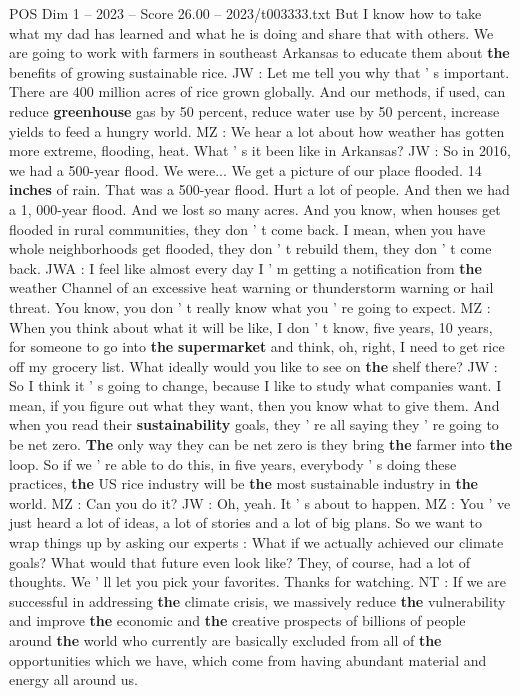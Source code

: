 \begin{textsample}{POS Dim 1 – 2023 – Score 26.00 – 2023/t003333.txt}
But I know how to take what my dad has learned and what he is doing and share that with others.
We are going to work with farmers in southeast Arkansas to educate them about \textbf{the} benefits of growing sustainable rice.
JW : Let me tell you why that ' s important.
There are 400 million acres of rice grown globally.
And our methods, if used, can reduce \textbf{greenhouse} gas by 50 percent, reduce water use by 50 percent, increase yields to feed a hungry world.
MZ : We hear a lot about how weather has gotten more extreme, flooding, heat.
What ' s it been like in Arkansas?
JW : So in 2016, we had a 500-year flood.
We were...
We get a picture of our place flooded. 14 \textbf{inches} of rain.
That was a 500-year flood.
Hurt a lot of people.
And then we had a 1, 000-year flood.
And we lost so many acres.
And you know, when houses get flooded in rural communities, they don ' t come back.
I mean, when you have whole neighborhoods get flooded, they don ' t rebuild them, they don ' t come back.
JWA : I feel like almost every day I ' m getting a notification from \textbf{the} weather Channel of an excessive heat warning or thunderstorm warning or hail threat.
You know, you don ' t really know what you ' re going to expect.
MZ : When you think about what it will be like, I don ' t know, five years, 10 years, for someone to go into \textbf{the} \textbf{supermarket} and think, oh, right, I need to get rice off my grocery list.
What ideally would you like to see on \textbf{the} shelf there?
JW : So I think it ' s going to change, because I like to study what companies want.
I mean, if you figure out what they want, then you know what to give them.
And when you read their \textbf{sustainability} goals, they ' re all saying they ' re going to be net zero. \textbf{The} only way they can be net zero is they bring \textbf{the} farmer into \textbf{the} loop.
So if we ' re able to do this, in five years, everybody ' s doing these practices, \textbf{the} US rice industry will be \textbf{the} most sustainable industry in \textbf{the} world.
MZ : Can you do it?
JW : Oh, yeah.
It ' s about to happen.
MZ : You ' ve just heard a lot of ideas, a lot of stories and a lot of big plans.
So we want to wrap things up by asking our experts : What if we actually achieved our climate goals?
What would that future even look like?
They, of course, had a lot of thoughts.
We ' ll let you pick your favorites.
Thanks for watching.
NT : If we are successful in addressing \textbf{the} climate crisis, we massively reduce \textbf{the} vulnerability and improve \textbf{the} economic and \textbf{the} creative prospects of billions of people around \textbf{the} world who currently are basically excluded from all of \textbf{the} opportunities which we have, which come from having abundant material and energy all around us.

\end{textsample}

